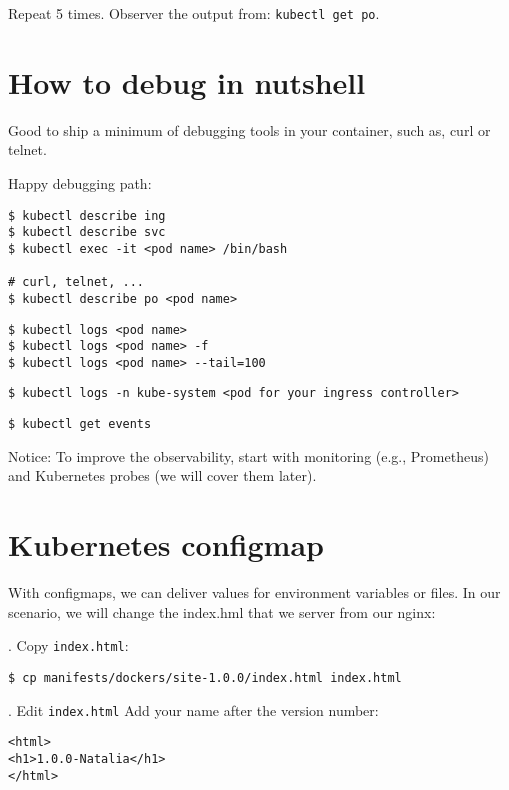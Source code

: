 \documentclass[12pt, letterpaper]{article}
\begin{document}
Repeat 5 times. Observer the output from: \verb|kubectl get po|.

%
\section{How to debug in nutshell}

Good to ship a minimum of debugging tools in your container, such as, curl or telnet.

Happy debugging path:

\begin{verbatim}
$ kubectl describe ing
$ kubectl describe svc
$ kubectl exec -it <pod name> /bin/bash

# curl, telnet, ...
$ kubectl describe po <pod name>
\end{verbatim}

\begin{verbatim}
$ kubectl logs <pod name>
$ kubectl logs <pod name> -f
$ kubectl logs <pod name> --tail=100
\end{verbatim}

\begin{verbatim}
$ kubectl logs -n kube-system <pod for your ingress controller>
\end{verbatim}

\begin{verbatim}
$ kubectl get events
\end{verbatim}

\bigskip
Notice: To improve the observability, start with monitoring (e.g., Prometheus) and Kubernetes probes (we will cover them later).
%
%
\pagebreak
\section{Kubernetes configmap}

With configmaps, we can deliver values for environment variables or files. In our scenario, we will change the index.hml that we server from our nginx:

. Copy \verb|index.html|:

\begin{verbatim}
$ cp manifests/dockers/site-1.0.0/index.html index.html
\end{verbatim}

. Edit \verb|index.html| Add your name after the version number:

\begin{verbatim}
<html>
<h1>1.0.0-Natalia</h1>
</html>
\end{verbatim}
\end{document}
